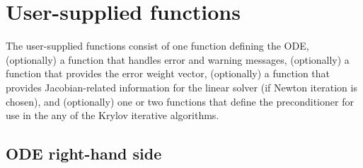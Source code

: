 \section{User-supplied functions}\label{ss:user_fct_sim}

The user-supplied functions consist of one function defining the ODE,
(optionally) a function that handles error and warning messages,
(optionally) a function that provides the error weight vector,
(optionally) a function that provides Jacobian-related information for the linear
solver (if Newton iteration is chosen), and (optionally) one or two functions 
that define the preconditioner for use in the any of the Krylov iterative algorithms. 

\subsection{ODE right-hand side} \label{ss:rhsFn}

